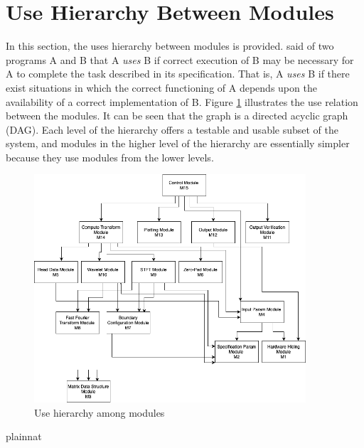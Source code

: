 \documentclass[12pt, titlepage]{article}
\begin{document}
\section{Use Hierarchy Between Modules} \label{SecUse}

In this section, the uses hierarchy between modules is
provided. \citet{Parnas1978} said of two programs A and B that A {\em uses} B if
correct execution of B may be necessary for A to complete the task described in
its specification. That is, A {\em uses} B if there exist situations in which
the correct functioning of A depends upon the availability of a correct
implementation of B.  Figure \ref{FigUH} illustrates the use relation between
the modules. It can be seen that the graph is a directed acyclic graph
(DAG). Each level of the hierarchy offers a testable and usable subset of the
system, and modules in the higher level of the hierarchy are essentially simpler
because they use modules from the lower levels.

\begin{figure}[H]
\centering
\includegraphics[width=0.9\textwidth]{uses_diagram.png}
\caption{Use hierarchy among modules}
\label{FigUH}
\end{figure}


 {plainnat}

\end{document}
